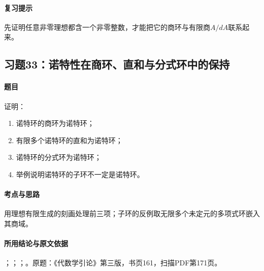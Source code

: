 \paragraph{复习提示}

先证明任意非零理想都含一个非零整数，才能把它的商环与有限商$A/dA$联系起来。

\subsection{习题33：诺特性在商环、直和与分式环中的保持}

\label{ex:4:33}

\paragraph{题目}

证明：
\begin{enumerate}[label=(\roman*)]
\item 诺特环的商环为诺特环；
\item 有限多个诺特环的直和为诺特环；
\item 诺特环的分式环为诺特环；
\item 举例说明诺特环的子环不一定是诺特环。
\end{enumerate}

\paragraph{考点与思路}

用理想有限生成的刻画处理前三项；子环的反例取无限多个未定元的多项式环嵌入其商域。

\paragraph{所用结论与原文依据}

；；；。原题：《代数学引论》第三版，书页161，扫描PDF第171页。


